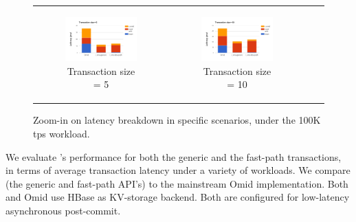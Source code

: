 \begin{figure}
\begin{tabular}{cccc}
    \begin{subfigure}[t]{0.4\textwidth}
	\includegraphics[width=\textwidth]{figs/stack-tx5.png}
    \caption[]{Transaction size = 5}
    \label{fig:stack-tx5}
  \end{subfigure} &

  \begin{subfigure}[t]{0.4\textwidth}
	\includegraphics[width=\textwidth]{figs/stack-tx10.png}
    \caption[]{Transaction size = 10}
    \label{fig:stack-tx10}
  \end{subfigure} \\
  
  \end{tabular}
  \caption{Zoom-in on latency breakdown in specific scenarios, under the 100K tps workload.}
  \label{fig:zoomin}
\end{figure}

We evaluate {\sys}'s performance for both the generic and the fast-path transactions, 
in terms of average transaction latency under a variety of workloads. We compare {\sys\/} 
(the generic and fast-path API's) to the mainstream Omid implementation. Both {\sys\/} 
and Omid use HBase as KV-storage backend. Both are configured for low-latency asynchronous 
post-commit.   

